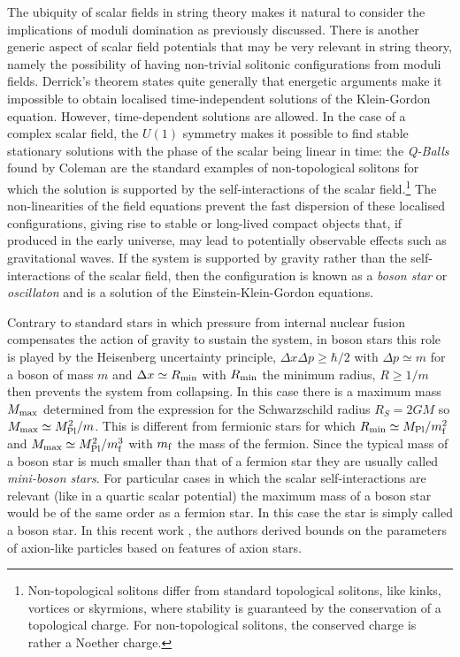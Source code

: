 The ubiquity of scalar fields in string theory makes it natural to consider the implications of moduli domination as previously discussed. There is another generic aspect of scalar field potentials that may be very relevant in string theory, namely the possibility of having non-trivial solitonic configurations from moduli fields. Derrick's theorem states quite generally that energetic arguments make it impossible to obtain localised time-independent solutions of the Klein-Gordon equation. However, time-dependent solutions are allowed. In the case of a complex scalar field, the $U(1)$ symmetry makes it possible to find stable stationary solutions with the phase of the scalar being linear in time:  the {\it Q-Balls} found by Coleman are the standard examples of non-topological solitons for which  the solution is supported by the self-interactions of the 
scalar field.\footnote{Non-topological solitons differ from standard topological solitons, like kinks, vortices or skyrmions, where stability is guaranteed by the conservation of a topological charge. For non-topological solitons, the conserved charge is rather a Noether charge.} The non-linearities of the field equations prevent the fast dispersion of these localised configurations, giving rise to stable or long-lived compact objects that, if produced in the early universe, may lead to potentially observable effects such as gravitational waves. If the system is supported by gravity rather than the self-interactions of the scalar field,  then the configuration is known as a {\it boson star} or {\it oscillaton} and is a solution of the Einstein-Klein-Gordon equations.  

Contrary to standard stars in which pressure from internal nuclear fusion compensates the action of gravity to sustain the system, in boson stars this role is played by the Heisenberg uncertainty principle,  $\Delta x \Delta p\geq \hbar/2$ with $\Delta p\simeq m$ for a boson of mass $m$ and $\Delta x\simeq R_{\rm min}$ with $R_{\rm min}$ the minimum radius, $R\geq 1/m$ then prevents the system from collapsing. In this case there is a maximum mass $M_{\rm max}$ determined from the expression for the Schwarzschild radius $R_S=2GM$ so $M_{\rm max}\simeq M_{\rm Pl}^2/m$. This is different from fermionic stars for which $R_{\rm min}\simeq M_{\rm Pl}/m_{\rm f}^2$ and $M_{\rm max}\simeq M_{\rm Pl}^2/m_{\rm f}^3$ with $m_{\rm f}$ the mass of the fermion. Since the typical mass of a boson star is much smaller than that of a fermion star they are usually called {\it mini-boson stars}. For particular cases in which the scalar self-interactions are relevant (like in a quartic scalar potential) the maximum mass of a boson star would be of the same order as a fermion star. In this case the star is simply called a boson star. In this recent work \cite{Fox:2023aat}, the authors derived bounds on the parameters of  axion-like particles  based on features of axion stars.

